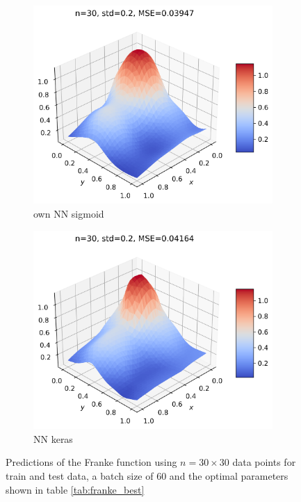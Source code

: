 \documentclass[11pt]{article}
\begin{document}
\begin{figure}[H]
\begin{subfigure}{.5\textwidth}
        \includegraphics[width=.92\textwidth]{../figures/NN_sigmoid_franke.png}
        \caption{own NN sigmoid}
        \label{fig:}
    \end{subfigure}
    \begin{subfigure}{.5\textwidth}
        \centering
        \includegraphics[width=.92\textwidth]{../figures/NN_tf_franke.png}
        \caption{NN keras}
        \label{fig:}
    \end{subfigure}
    \caption{Predictions of the Franke function using $n=30\times 30$ data points for train and test data, a batch size of 60 and the optimal parameters shown in table \ref{tab:franke_best}}
    \label{fig:franke_pred}
\end{figure}
\end{document}
